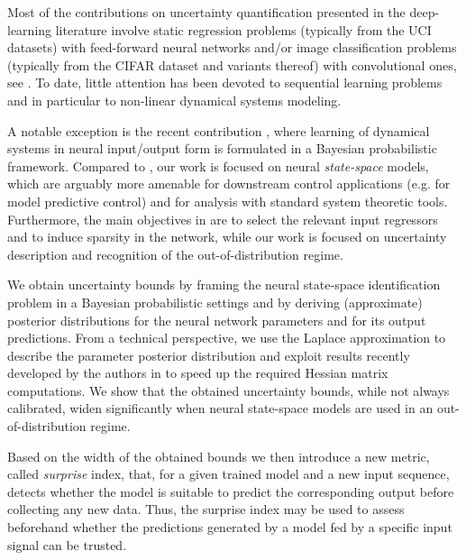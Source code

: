 \documentclass{ifacconf}
\begin{document}
Most of the contributions on uncertainty quantification presented in the deep-learning literature involve static regression problems (typically from the UCI datasets) with feed-forward neural networks and/or image classification problems (typically from the CIFAR dataset and variants thereof) with convolutional ones, see \cite{maddox2019simple, wilson2020bayesian, izmailov2021bayesian}. To date, little attention has been devoted to sequential learning problems and in particular 
to non-linear dynamical systems modeling.

A notable exception is the recent contribution \citep{zhou2022sparse}, where learning of dynamical systems in neural input/output form is formulated  
in a Bayesian probabilistic framework. Compared to \citep{zhou2022sparse}, our work is focused on neural \emph{state-space} models, which are arguably more amenable for downstream control applications (e.g. for model predictive control) and for analysis with standard system theoretic tools. Furthermore, the main objectives in \citep{zhou2022sparse} are to select the relevant input regressors and to induce sparsity in the network, while our work is focused on uncertainty description and recognition of the out-of-distribution regime. 

We obtain uncertainty bounds by framing the neural state-space identification problem in a Bayesian probabilistic settings and by deriving 
(approximate) posterior distributions for the neural network parameters and for its output predictions.
From a technical perspective, we use the Laplace approximation \citep{bishop2006pattern} to describe the parameter posterior distribution and exploit results recently developed by the authors in \citep{forgione2022adaptation} to speed up the required Hessian matrix computations.
We show that the obtained uncertainty bounds, while not always calibrated, widen significantly when neural state-space models are used in an out-of-distribution regime. 

Based on the width of the obtained bounds we then introduce a new metric, called \emph{surprise} index, that, for a given trained model and a {new} input sequence, detects whether the model is suitable to predict the corresponding output before collecting any new data. 
Thus, the surprise index may be used to assess beforehand whether the predictions generated by a model fed by a specific input
signal can be trusted.
\end{document}
